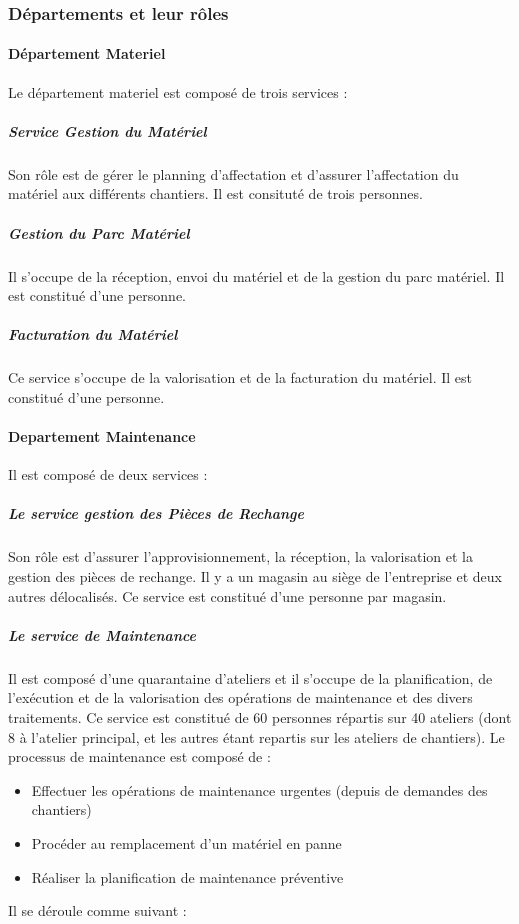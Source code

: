         \subsubsection{Départements et leur rôles}
            \paragraph{Département Materiel}
                Le département materiel est composé de trois services :
                \subparagraph{Service Gestion du Matériel}
                    Son rôle est de gérer le planning d’affectation et d’assurer l’affectation du matériel aux différents chantiers. Il est consituté de trois personnes.
                \subparagraph{Gestion du Parc Matériel}
                    Il s’occupe de la réception, envoi du matériel et de la gestion du parc matériel. Il est constitué d'une personne.
                \subparagraph{Facturation du Matériel}
                    Ce service s’occupe de la valorisation et de la facturation du matériel. Il est constitué d'une personne.        
                
            \paragraph{Departement Maintenance}
                Il est composé de deux services :
                \subparagraph{Le service gestion des Pièces de Rechange}
                    Son rôle est d’assurer l’approvisionnement, la réception, la valorisation et la gestion des pièces   de rechange. Il y a un magasin au siège de l’entreprise et deux autres délocalisés. Ce service est constitué d'une personne par magasin. 
                \subparagraph{Le service de Maintenance}
                    Il est composé d’une quarantaine d’ateliers et il s’occupe de la planification, de l’exécution et de la valorisation des opérations de maintenance et des divers traitements. Ce service est constitué de 60 personnes répartis sur 40 ateliers (dont 8 à l’atelier principal, et les autres étant repartis sur les ateliers de chantiers).
Le processus de maintenance est composé de :
\begin{itemize}
	\item Effectuer les opérations de maintenance urgentes (depuis de demandes des chantiers)
\item Procéder au remplacement d'un matériel en panne 
\item Réaliser la planification de maintenance préventive
\end{itemize}
	Il se déroule comme suivant :

